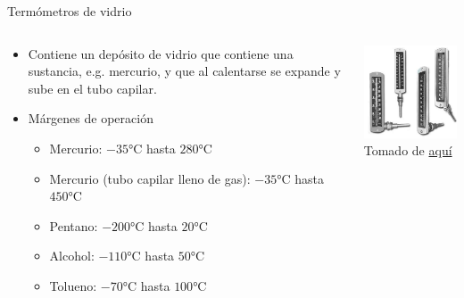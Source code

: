 \documentclass[aspectratio=169]{beamer}
\begin{document}
\begin{frame}{Termómetros de vidrio}
    \begin{columns}[c, onlytextwidth]
        \begin{column}{0.5\textwidth}
            \begin{itemize}
                \item Contiene un depósito de vidrio que contiene una sustancia, e.g. mercurio, y que al calentarse se expande y sube en el tubo capilar.  
                \item Márgenes de operación \cite{sole2005instrumentacion}
                \begin{itemize}
                    \item Mercurio: $-35\si{\celsius}$ hasta $280\si{\celsius}$
                    \item Mercurio (tubo capilar lleno de gas): $-35\si{\celsius}$ hasta $450\si{\celsius}$
                    \item Pentano: $-200\si{\celsius}$ hasta $20\si{\celsius}$
                    \item Alcohol: $-110\si{\celsius}$ hasta $50\si{\celsius}$
                    \item Tolueno: $-70\si{\celsius}$ hasta $100\si{\celsius}$
                \end{itemize}
            \end{itemize}
        \end{column}
        \begin{column}{0.45\textwidth}
            \centering
            \includegraphics[width=6cm]{fig/TermometroVidrio.jpg}
             \\ \tiny{Tomado de \href{http://famater.com.ar/?p=611}{aquí}}
        \end{column}
    \end{columns}
\end{frame}
\end{document}
